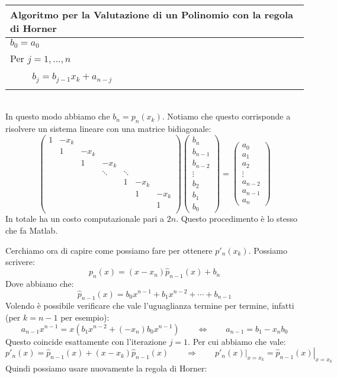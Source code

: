 \documentclass[11pt,a4paper,twoside]{article}
\theoremstyle{definition}
\begin{document}
\begin{itemize}
		\begin{tabular}{l}
		\\
		\textbf{Algoritmo per la Valutazione di un Polinomio con la regola di Horner}\\
		\hline
		$b_0 = a_0$\\
		Per $j = 1,...,n$\\
		$\qquad$ $b_j = b_{j-1}x_k + a_{n-j}$\\
		\\
		\end{tabular}\\
		In questo modo abbiamo che $b_n = p_n(x_k)$. Notiamo che questo corrisponde a risolvere un sistema lineare con una matrice bidiagonale:
		\[
			\begin{pmatrix}
				1 & -x_k\\
				& 1 & -x_k\\
				&& 1 & -x_k\\
				&&& \ddots & \ddots\\
				&&&& 1 & - x_k\\
				&&&&& 1 & -x_k\\
				&&&&&& 1\\
			\end{pmatrix}
			\begin{pmatrix}
				b_n\\
				b_{n-1}\\
				b_{n-2}\\
				\vdots\\
				b_2\\
				b_1\\
				b_0
			\end{pmatrix} =
			\begin{pmatrix}
				a_0\\
				a_1\\
				a_2\\
				\vdots\\
				a_{n-2}\\
				a_{n-1}\\
				a_n
			\end{pmatrix}
		\]
		In totale ha un costo computazionale pari a $2n$. Questo procedimento è lo stesso che fa Matlab.
\end{itemize}

Cerchiamo ora di capire come possiamo fare per ottenere $p'_n(x_k)$. Possiamo scrivere:
\[ p_n(x) = (x-x_n)\hat p_{n-1}(x) + b_n \]
Dove abbiamo che:
\[ \hat p_{n-1}(x) = b_0x^{n-1} + b_1x^{n-2} + \cdots + b_{n-1} \]
Volendo è possibile verificare che vale l'uguaglianza termine per termine, infatti (per $k = n-1$ per esempio):
\[ a_{n-1}x^{n-1} = x(b_{1}x^{n-2} + (-x_n)b_0x^{n-1}) \qquad \Leftrightarrow \qquad a_{n-1} = b_1 - x_{n}b_0 \]
Questo coincide esattamente con l'iterazione $j = 1$. Per cui abbiamo che vale:
\[ p'_n(x) = \hat p_{n-1}(x) + (x-x_k) \hat p_{n-1}(x) \qquad \Rightarrow \qquad \left. p'_n(x)\right|_{x = x_k} = \left. \hat p_{n-1}(x) \right|_{x = x_k} \]
Quindi possiamo usare nuovamente la regola di Horner:
\end{document}
